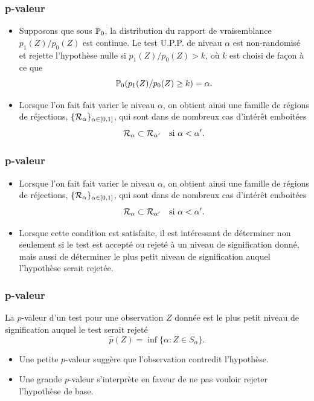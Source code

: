 \begin{frame}
\frametitle{p-valeur}
\begin{itemize}
\item Supposons que sous $\operatorname{{\mathbb P}}_0$, la distribution du rapport de vraisemblance $p_1(Z)/p_0(Z)$ est continue. Le test U.P.P.
de niveau $\alpha$ est non-randomisé et rejette l'hypothèse nulle si $p_1(Z)/p_0(Z) > k$, où $k$ est choisi de façon à ce que
\[
\operatorname{{\mathbb P}}_0 ( p_1(Z)/ p_0(Z) \geq k) = \alpha.
\]
\item Lorsque l'on fait fait varier le niveau $\alpha$, on obtient ainsi une famille de régions de réjections, $\{\mathcal{R}_\alpha\}_{\alpha \in \left[0,1\right]}$, qui sont dans de nombreux cas d'intérêt emboitées
    $$
    \mathcal{R}_\alpha \subset \mathcal{R}_{\alpha'} \quad \text{si $\alpha < \alpha'$}.
    $$
\end{itemize}
\end{frame}


\begin{frame}
\frametitle{p-valeur}
\begin{itemize}
\item Lorsque l'on fait fait varier le niveau $\alpha$, on obtient ainsi une famille de régions de réjections, $\{\mathcal{R}_\alpha\}_{\alpha \in \left[0,1\right]}$, qui sont dans de nombreux cas d'intérêt emboitées
    $$
    \mathcal{R}_\alpha \subset \mathcal{R}_{\alpha'} \quad \text{si $\alpha < \alpha'$}.
    $$
\item Lorsque cette condition est satisfaite, il est intéressant de déterminer non seulement si le test est accepté ou rejeté à un niveau de signification donné, mais aussi de déterminer \alert{le plus petit niveau de signification} auquel l'hypothèse serait rejetée.
\end{itemize}
\end{frame}

\begin{frame}
\frametitle{p-valeur}
\begin{definition}[p-valeur]
La $p$-valeur d'un test pour une observation $Z$ donnée est le plus petit niveau de signification auquel le test serait rejeté
$$
\hat{p}(Z)= \inf\{ \alpha: Z \in S_\alpha\}.
$$
\end{definition}
\begin{itemize}
\item Une petite $p$-valeur suggère que l'observation contredit l'hypothèse.
\item Une grande $p$-valeur s'interprète en faveur de ne pas vouloir rejeter l'hypothèse de base.
\end{itemize}
\end{frame}

